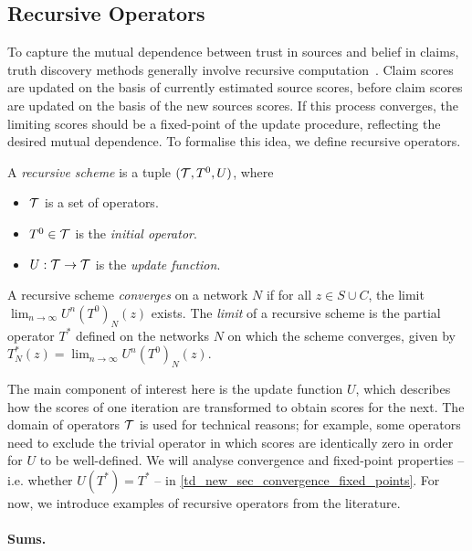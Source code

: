 \subsection{Recursive Operators}

To capture the mutual dependence between trust in sources and belief in claims,
truth discovery methods generally involve recursive
computation~\cite{pasternack2010,yin2008,yang_probabilistic_2019,du2019,zhang2018,li2016,galland2010,zhi2015}.
Claim scores are updated on the basis of currently estimated source scores,
before claim scores are updated on the basis of the new sources scores. If this
process converges, the limiting scores should be a fixed-point of the update
procedure, reflecting the desired mutual dependence. To formalise this idea, we
define recursive operators.

\begin{definition}
    A \emph{recursive scheme} is a tuple $(\mathcal{T}, T^0, U)$, where
    \begin{itemize}
        \item $\mathcal{T}$ is a set of operators.
        \item $T^0 \in \mathcal{T}$ is the \emph{initial operator}.
        \item $U: \mathcal{T} \to \mathcal{T}$ is the \emph{update function}.
    \end{itemize}
    A recursive scheme \emph{converges} on a network $N$ if for all $z
    \in S \cup C$, the limit $\lim_{n \to \infty}{U^n(T^0)_N(z)}$ exists. The
    \emph{limit} of a recursive scheme is the partial operator $T^*$ defined on
    the networks $N$ on which the scheme converges, given by $T^*_N(z) =
    \lim_{n \to \infty}{U^n(T^0)_N(z)}$.
\end{definition}

The main component of interest here is the update function $U$, which describes
how the scores of one iteration are transformed to obtain scores for the next.
The domain of operators $\mathcal{T}$ is used for technical reasons; for example, some
operators need to exclude the trivial operator in which scores are identically
zero in order for $U$ to be well-defined. We will analyse convergence and
fixed-point properties -- i.e. whether $U(T^*) = T^*$ -- in
\cref{td_new_sec_convergence_fixed_points}. For now, we introduce examples of
recursive operators from the literature.

\paragraph{Sums.}

